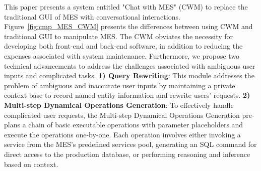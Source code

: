 \documentclass[preprint,12pt]{elsarticle}
\begin{document}
This paper presents a system entitled "Chat with MES" (CWM) to replace the traditional GUI of MES with conversational interactions.
Figure~\ref{fig:cmp_MES_CWM} presents the differences between using CWM and traditional GUI to manipulate MES.
The CWM obviates the necessity for developing both front-end and back-end software, in addition to reducing the expenses associated with system maintenance.
Furthermore, we propose two technical advancements to address the challenges associated with ambiguous user inputs and complicated tasks.
\textbf{1) Query Rewriting}: This module addresses the problem of ambiguous and inaccurate user inputs by maintaining a private context base to record named entity information and rewrite users' requests. 
\textbf{2) Multi-step Dynamical Operations Generation}: 
To effectively handle complicated user requests, the Multi-step Dynamical Operations Generation pre-plans a chain of basic executable operations with parameter placeholders and execute the operations one-by-one.
Each operation involves either invoking a service from the MES's predefined services pool, generating an SQL command for direct access to the production database, or performing reasoning and inference based on context.
\end{document}
